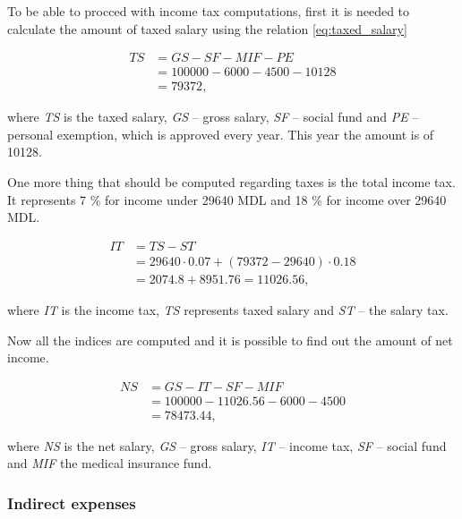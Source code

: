 To be able to procced with income tax computations, first it is needed to calculate the amount of taxed salary using the relation \eqref{eq:taxed_salary}

\begin{equation}\label{eq:taxed_salary}
\begin{split}
 TS  &= GS - SF - MIF - PE\\
     &= 100000 - 6000 - 4500 - 10128\\
     &= 79372,
\end{split}
\end{equation}

\noindent
where \textit{TS} is the taxed salary, \textit{GS} -- gross salary, \textit{SF} -- social fund and \textit{PE} -- personal exemption, which is approved every year. This year the amount is of 10128. 

One more thing that should be computed regarding taxes is the total income tax. It represents 7 \% for income under 29640 MDL and 18 \% for income over 29640 MDL. 

\begin{equation}
\begin{split}
 IT  &= TS - ST\\
     &= 29640 \cdot 0.07 + (79372 - 29640) \cdot 0.18\\
     &= 2074.8 + 8951.76 = 11026.56,
\end{split}
\end{equation}

\noindent
where \textit{IT} is the income tax, \textit{TS} represents taxed salary and \textit{ST} -- the salary tax. 

Now all the indices are computed and it is possible to find out the amount of net income. 

\begin{equation}
\begin{split}
 NS  &= GS - IT - SF - MIF\\
     &= 100000 - 11026.56 - 6000 - 4500\\
     &= 78473.44,
\end{split}
\end{equation}

\noindent
where \textit{NS} is the net salary, \textit{GS} -- gross salary, \textit{IT} -- income tax, \textit{SF} -- social fund and \textit{MIF} the medical insurance fund. 

\subsubsection{Indirect expenses}

